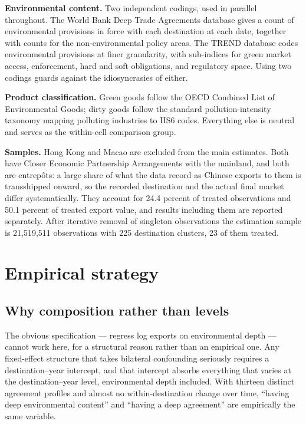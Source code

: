 \documentclass[11pt]{article}
\begin{document}
\textbf{Environmental content.} Two independent codings, used in parallel throughout. The World Bank
Deep Trade Agreements database gives a count of environmental provisions in force with each
destination at each date, together with counts for the non-environmental policy areas. The TREND
database codes environmental provisions at finer granularity, with sub-indices for green market
access, enforcement, hard and soft obligations, and regulatory space. Using two codings guards
against the idiosyncrasies of either.

\textbf{Product classification.} Green goods follow the OECD Combined List of Environmental Goods;
dirty goods follow the standard pollution-intensity taxonomy mapping polluting industries to HS6
codes. Everything else is neutral and serves as the within-cell comparison group.

\textbf{Samples.} Hong Kong and Macao are excluded from the main estimates. Both have Closer Economic
Partnership Arrangements with the mainland, and both are entrep\^ots: a large share of what the data
record as Chinese exports to them is transshipped onward, so the recorded destination and the actual
final market differ systematically. They account for 24.4 percent of treated observations and 50.1
percent of treated export value, and results including them are reported separately. After iterative
removal of singleton observations the estimation sample is 21,519,511 observations with 225
destination clusters, 23 of them treated.

\section{Empirical strategy}

\subsection*{Why composition rather than levels}

The obvious specification --- regress log exports on environmental depth --- cannot work here, for a
structural reason rather than an empirical one. Any fixed-effect structure that takes bilateral
confounding seriously requires a destination--year intercept, and that intercept absorbs everything
that varies at the destination--year level, environmental depth included. With thirteen distinct
agreement profiles and almost no within-destination change over time, ``having deep environmental
content'' and ``having a deep agreement'' are empirically the same variable.
\end{document}
